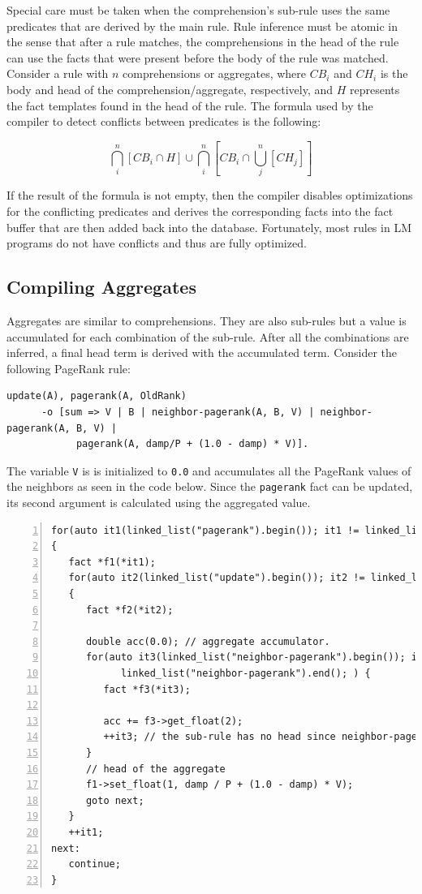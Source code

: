 Special care must be taken when the comprehension's sub-rule uses the same
predicates that are derived by the main rule.
Rule inference must be atomic in the sense that after a rule matches, the
comprehensions in the head of the rule can use the facts that were present
before the body of the rule was matched.
Consider a rule with $n$ comprehensions or aggregates, where $CB_i$ and $CH_i$
is the body and head of the comprehension/aggregate, respectively, and $H$
represents the fact templates found in the head of the rule.
The formula used by the compiler to detect conflicts between predicates is the
following:

\[
\bigcap^{n}_i[CB_i \cap H] \cup \bigcap^{n}_i [CB_i \cap \bigcup^{n}_j[CH_j]]
\]

If the result of the formula is not empty, then the compiler disables
optimizations for the conflicting predicates and derives the corresponding facts
into the fact buffer that are then added back into the database.
Fortunately, most rules in LM programs do not have conflicts and thus
are fully optimized.

\subsection{Compiling Aggregates}

Aggregates are similar to comprehensions. They are also sub-rules but a value is
accumulated for each combination of the sub-rule. After all the combinations are
inferred, a final head term is derived with the accumulated term. Consider the following
PageRank rule:

\begin{Verbatim}[fontsize=\scriptsize]
update(A), pagerank(A, OldRank)
      -o [sum => V | B | neighbor-pagerank(A, B, V) | neighbor-pagerank(A, B, V) |
            pagerank(A, damp/P + (1.0 - damp) * V)].
\end{Verbatim}

The variable \texttt{V} is is initialized to \texttt{0.0} and accumulates all
the PageRank values of the neighbors as seen in the code below. Since the
\texttt{pagerank} fact can be updated, its second argument is calculated using
the aggregated value.

\begin{Verbatim}[numbers=left,fontsize=\scriptsize]
for(auto it1(linked_list("pagerank").begin()); it1 != linked_list("pagerank").end(); )
{
   fact *f1(*it1);
   for(auto it2(linked_list("update").begin()); it2 != linked_list("update").end(); )
   {
      fact *f2(*it2);

      double acc(0.0); // aggregate accumulator.
      for(auto it3(linked_list("neighbor-pagerank").begin()); it3 !=
            linked_list("neighbor-pagerank").end(); ) {
         fact *f3(*it3);

         acc += f3->get_float(2);
         ++it3; // the sub-rule has no head since neighbor-pagerank is re-derived
      }
      // head of the aggregate
      f1->set_float(1, damp / P + (1.0 - damp) * V);
      goto next;
   }
   ++it1;
next:
   continue;
}
\end{Verbatim}
